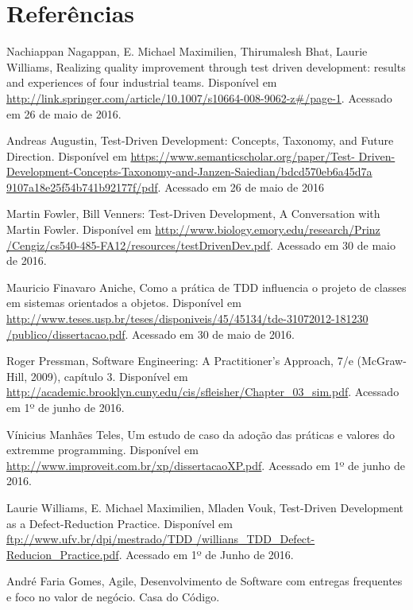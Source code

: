 \documentclass[12pt]{article}
\begin{document}
  \section{Referências}

  \begin{flushleft}
  Nachiappan Nagappan, E. Michael Maximilien, Thirumalesh Bhat,
  Laurie Williams, Realizing quality improvement through test driven 
  development: results and experiences of four industrial teams. Disponível em
  \url{http://link.springer.com/article/10.1007/s10664-008-9062-z#/page-1}.
  Acessado em 26 de maio de 2016.

  Andreas Augustin, Test-Driven Development: Concepts, Taxonomy, and Future 
  Direction. Disponível em \url{https://www.semanticscholar.org/paper/Test-
  Driven-Development-Concepts-Taxonomy-and-Janzen-Saiedian/bdcd570eb6a45d7a
  9107a18e25f54b741b92177f/pdf}. Acessado em 26 de maio de 2016

  Martin Fowler, Bill Venners: Test-Driven Development, A Conversation with 
  Martin Fowler. Disponível em \url{http://www.biology.emory.edu/research/Prinz
  /Cengiz/cs540-485-FA12/resources/testDrivenDev.pdf}. Acessado em 30 de maio de
  2016.

  Mauricio Finavaro Aniche, Como a prática de TDD influencia o projeto de 
  classes em sistemas orientados a objetos. Disponível em 
  \url{http://www.teses.usp.br/teses/disponiveis/45/45134/tde-31072012-181230
  /publico/dissertacao.pdf}. Acessado em 30 de maio de 2016.

  Roger Pressman, Software Engineering: A Practitioner’s Approach, 7/e 
  (McGraw-Hill, 2009), capítulo 3.  Disponível em
  \url{http://academic.brooklyn.cuny.edu/cis/sfleisher/Chapter_03_sim.pdf}.
  Acessado em 1º de junho de 2016.

  Vínicius Manhães Teles, Um estudo de caso da adoção das práticas e valores do
  extremme programming. Disponível em
  \url{http://www.improveit.com.br/xp/dissertacaoXP.pdf}. Acessado em 1º de 
  junho de 2016.

  Laurie Williams, E. Michael Maximilien, Mladen Vouk, Test-Driven Development 
  as a Defect-Reduction Practice. Disponível em 
  \url{ftp://www.ufv.br/dpi/mestrado/TDD
  /willians_TDD_Defect-Reducion_Practice.pdf}. Acessado em 1º de Junho de 2016.

  André Faria Gomes, Agile, Desenvolvimento de Software com entregas frequentes
  e foco no valor de negócio. Casa do Código.
  
  \end{flushleft}
\end{document}

